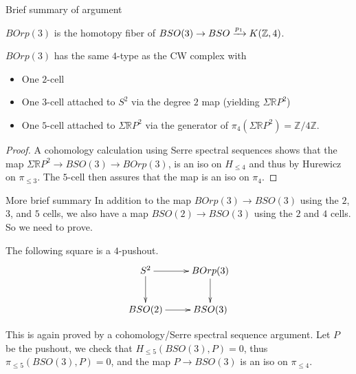 \documentclass[beamer]{beamer}
\begin{document}
\begin{frame}{Brief summary of argument}
\begin{definition}
$BOrp(3)$ is the homotopy fiber of $BSO(3) \rightarrow BSO \xrightarrow{p_1} K(\mathbb Z,4)$.  
\end{definition}

\begin{theorem}
$BOrp(3)$ has the same $4$-type as the CW complex with
\begin{itemize}
\item One $2$-cell
\item One $3$-cell attached to $S^2$ via the degree $2$ map (yielding $\Sigma \mathbb{R}P^2$)
\item One $5$-cell attached to $\Sigma \mathbb{R}P^2$ via the generator of $\pi_4(\Sigma \mathbb{R}P^2) = \mathbb{Z}/4\mathbb{Z}$.
\end{itemize}
\end{theorem}
\begin{proof}
A cohomology calculation using Serre spectral sequences shows that the map $\Sigma \mathbb{R}P^2 \rightarrow BSO(3) \rightarrow BOrp(3)$, is an iso on $H_{\leq 4}$ and thus by Hurewicz on $\pi_{\leq 3}$.  The $5$-cell then assures that the map is an iso on $\pi_4$.
\end{proof}
\end{frame}

\begin{frame}{More brief summary}
In addition to the map $BOrp(3) \rightarrow BSO(3)$ using the $2$, $3$, and $5$ cells, we also have a map $BSO(2) \rightarrow BSO(3)$ using the $2$ and $4$ cells.  So we need to prove.

\begin{theorem}
The following square is a $4$-pushout.
\begin{equation*}
\xymatrix{
S^2 \ar[r] \ar[d] & BOrp(3) \ar[d] \\
BSO(2) \ar[r] & BSO(3)
}
\end{equation*}
\end{theorem}

This is again proved by a cohomology/Serre spectral sequence argument.  Let $P$ be the pushout, we check that $H_{\leq 5}(BSO(3),P) = 0$, thus $\pi_{\leq 5}(BSO(3), P) = 0$, and the map $P \rightarrow BSO(3)$ is an iso on $\pi_{\leq 4}$.
\end{frame}
\end{document}
